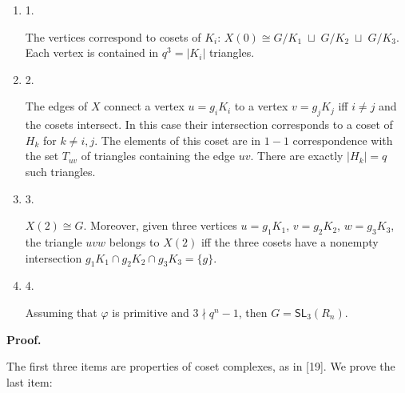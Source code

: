 \begin{enumerate}


\item[] 
1. 


The vertices correspond to cosets of $K_{i}$: $X(0)\cong G/K_{1}\;\sqcup\;G/K_{2}\;\sqcup\;G/K_{3}$. Each vertex is contained in $q^{3}=|K_{i}|$ triangles.\par





\item[] 
2. 


The edges of $X$ connect a vertex $u=g_{i}K_{i}$ to a vertex $v=g_{j}K_{j}$ iff $i\neq j$ and the cosets intersect. In this case their intersection corresponds to a coset of $H_{k}$ for $k\neq i,j$. The elements of this coset are in $1-1$ correspondence with the set $T_{uv}$ of triangles containing the edge $uv$. There are exactly $|H_{k}|=q$ such triangles.\par





\item[] 
3. 


$X(2)\cong G$. Moreover, given three vertices $u=g_{1}K_{1}$, $v=g_{2}K_{2}$, $w=g_{3}K_{3}$, the triangle $uvw$ belongs to $X(2)$ iff the three cosets have a nonempty intersection $g_{1}K_{1}\cap g_{2}K_{2}\cap g_{3}K_{3}=\{g\}$.\par





\item[] 
4. 


Assuming that $\varphi$ is primitive and $3\nmid q^{n}-1$, then $G=\mathsf{SL}_{3}(R_{n})$.\par





\end{enumerate}






\par\medskip\noindent\textbf{
\textbf{Proof}.}\par




The first three items are properties of coset complexes, as in [19]. We prove the last item:\par




